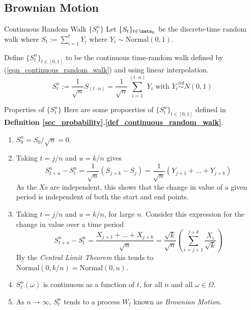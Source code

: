 \documentclass[11pt,a4paper]{article}
\begin{document}
\subsection{Brownian Motion}

  \begin{definition}{Continuous Random Walk $\{S_t^n\}$}\label{def_continuous_random_walk}
    Let $\{S_t\}_{t\in\nats_0}$ be the discrete-time random walk where $S_t:=\sum_{i=1}^tY_i$ where $Y_i\sim\text{Normal}(0,1)$.
    \par Define $\{S_t^n\}_{t\in[0,1]}$ to be the continuous time-random walk defined by (\ref{eqn_continuous_random_walk}) and using linear interpolation.
    \begin{equation}\label{eqn_continuous_random_walk}
      S_t^n:=\frac1{\sqrt{n}}S_{(t\cdot n)}=\frac1{\sqrt{n}}\sum_{i=1}^{(t\cdot n)}Y_i\text{ with }Y_i\overset{iid}{\sim} N(0,1)
    \end{equation}
  \end{definition}

  \begin{theorem}{Properties of $\{S_t^n\}$}
    Here are some propoerties of $\{S_t^n\}_{t\in[0,1]}$ defined in \textbf{Definition \ref{sec_probability}.\ref{def_continuous_random_walk}}.
    \begin{enumerate}
      \item $S_0^{n}=S_0/\sqrt{n}=0$.
      \item Taking $t=j/n$ and $u=k/n$ gives
      \[ S_{t+u}^{n}-S_t^n=\frac1{\sqrt{n}}(S_{j+k}-S_j)=\frac1{\sqrt{n}}(Y_{j+1}+\dots+Y_{j+k}) \]
      As the $X$s are independent, this shows that the change in value of a given period is independent of both the start and end points.
      \item Taking $t=j/n$ and $u=k/n$, for large $n$. Consider this expression for the change in value over a time period
      \[ S_{t+u}^n-S_t^n=\frac{X_{j+1}+\dots+X_{j+k}}{\sqrt{n}}=\frac{\sqrt{k}}{\sqrt{n}}\left(\sum_{i=j+1}^{j+k}\frac{X_i}{\sqrt{k}}\right) \]
      By the \textit{Central Limit Theorem} this tends to $\text{Normal}\left(0,k/n\right)=\text{Normal}\left(0,u\right)$.
      \item $S_t^n(\omega)$ is continuous as a function of $t$, for all $n$ and all $\omega\in\Omega$.
      \item As $n\to\infty$, $S_t^n$ tends to a process $W_t$ known as \textit{Brownian Motion}.
    \end{enumerate}
  \end{theorem}
\end{document}
